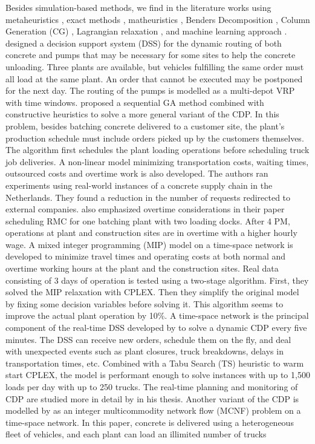 \documentclass{article}
\begin{document}
{Besides simulation-based methods, we find in the literature works using metaheuristics \citep{faria2006distributed, misir2011selection, maghrebi2016sequential, yang2022concrete}, exact methods \citep{yan2007optimal, kinable2014concrete}, matheuristics \citep{schmid2009hybrid, schmid2010hybridization}, Benders Decomposition \citep{maghrebi2014benders}, Column Generation (CG) \citep{maghrebi2014solving, maghrebi2016column}, Lagrangian relaxation \citep{narayanan2015using}, and machine learning approach \citep{graham2006modeling, maghrebi2014exploring, maghrebi2016matching}. \cite{matsatsinis2004towards} designed a decision support system (DSS) for the dynamic routing of both concrete and pumps that may be necessary for some sites to help the concrete unloading. Three plants are available, but vehicles fulfilling the same order must all load at the same plant. An order that cannot be executed may be postponed for the next day. The routing of the pumps is modelled as a multi-depot VRP with time windows. \cite{naso2007genetic} proposed a sequential GA method combined with constructive heuristics to solve a more general variant of the CDP. In this problem, besides batching concrete delivered to a customer site, the plant's production schedule must include orders picked up by the customers themselves. The algorithm first schedules the plant loading operations before scheduling truck job deliveries. A non-linear model minimizing transportation costs, waiting times, outsourced costs and overtime work is also developed. The authors ran experiments using real-world instances of a concrete supply chain in the Netherlands. They found a reduction in the number of requests redirected to external companies. \cite{yan2007optimal} also emphasized overtime considerations in their paper scheduling RMC for one batching plant with two loading docks. After 4 PM, operations at plant and construction sites are in overtime with a higher hourly wage. A mixed integer programming (MIP) model on a time-space network is developed to minimize travel times and operating costs at both normal and overtime working hours at the plant and the construction sites. Real data consisting of 3 days of operation is tested using a two-stage algorithm. First, they solved the MIP relaxation with CPLEX. Then they simplify the original model by fixing some decision variables before solving it. This algorithm seems to improve the actual plant operation by 10\%. A time-space network is the principal component of the real-time DSS developed by \cite{durbin2008or} to solve a dynamic CDP every five minutes. The DSS can receive new orders, schedule them on the fly, and deal with unexpected events such as plant closures, truck breakdowns, delays in transportation times, etc. Combined with a Tabu Search (TS) heuristic to warm start CPLEX, the model is performant enough to solve instances with up to 1,500 loads per day with up to 250 trucks. The real-time planning and monitoring of CDP are studied more in detail by \cite{garza2021dynamic} in his thesis. Another variant of the CDP is modelled by \cite{schmid2009hybrid} as an integer multicommodity network flow (MCNF) problem on a time-space network. In this paper, concrete is delivered using a heterogeneous fleet of vehicles, and each plant can load an illimited number of trucks }
\end{document}
